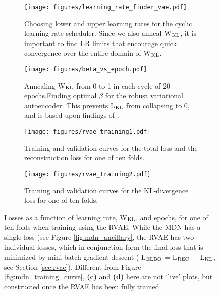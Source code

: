 \begin{figure*}
\begin{subfigure}{0.49\textwidth}
    \centering
    \texttt{[image: figures/learning\_rate\_finder\_vae.pdf]}
    \caption{Choosing lower and upper learning rates for the cyclic learning rate scheduler. Since we also anneal W$_{\rm KL}$, it is important to find LR limits that encourage quick convergence over the entire domain of W$_{\rm KL}$.}
    \label{fig:vae_find_lr}
\end{subfigure}
\hfill
\begin{subfigure}{0.49\textwidth}
    \centering
    \texttt{[image: figures/beta\_vs\_epoch.pdf]}
    \caption{Annealing W$_{\rm KL}$ from 0 to 1 in each cycle of 20 epochs.Finding optimal $\beta$ for the robust variational autoencoder. This prevents L$_{\rm KL}$ from collapsing to 0, and is based upon findings of \cite{cyclical_wkl_annealing}.}
    \label{fig:vae_weightkl_vs_epoch}
\end{subfigure}
\newline
\begin{subfigure}{0.49\textwidth}
    \centering
    \texttt{[image: figures/rvae\_training1.pdf]}
    \caption{Training and validation curves for the total loss and the reconstruction loss for one of ten folds.}
    \label{fig:vae_trainingcurve1}
\end{subfigure}
\hfill
\begin{subfigure}{0.49\textwidth}
    \centering
    \texttt{[image: figures/rvae\_training2.pdf]}
    \caption{Training and validation curves for the KL-divergence loss for one of ten folds.}
    \label{fig:vae_trainingcurve2}
\end{subfigure}
\label{fig:vae_ancillary}
\caption{Losses as a function of learning rate, W$_{\rm KL}$, and epochs, for one of ten folds when training using the RVAE. While the MDN has a single loss (see Figure \ref{fig:mdn_ancillary}, the RVAE has two individual losses, which in conjunction form the final loss that is minimized by mini-batch gradient descent (-L$_{\rm ELBO}$ = L$_{\rm REC}$ + L$_{\rm KL}$, see Section \ref{sec:rvae}). Different from Figure \ref{fig:mdn_training_curve}, \textbf{(c)} and \textbf{(d)} here are not `live' plots, but constructed once the RVAE has been fully trained.}
\end{figure*}
\fi